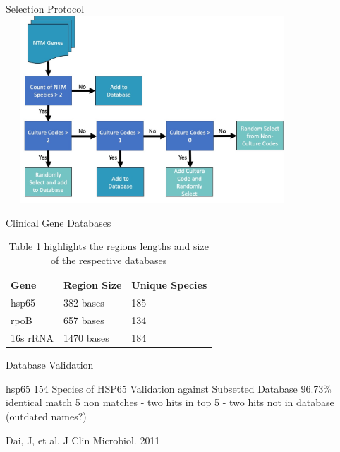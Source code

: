 \documentclass[11pt]{beamer}
\begin{document}
  \begin{frame}{Selection Protocol}
  \center
  \includegraphics[height=7cm, width=11cm]{CPBS_11_18/Selection_Protocol.jpg}
  \end{frame}
  \begin{frame}{Clinical Gene Databases}
  \begin{table}[]
  \begin{tabular}{|l|l|l|}
  \hline
  {\ul \textbf{Gene}} & {\ul \textbf{Region Size}} & {\ul \textbf{Unique Species}} \\     \hline
  hsp65 & 382 bases & 185 \\ \hline
  rpoB & 657 bases & 134 \\ \hline
  16s rRNA & 1470 bases & 184 \\ \hline
  \end{tabular}
  \caption{Table 1 highlights the regions lengths and size of the respective databases}
  \label{Test_Table}
  \end{table}
  \end{frame}
	\begin{frame}{Database Validation}
	\begin{block}{hsp65}
	154 Species of HSP65 Validation against Subsetted Database
	96.73\% identical match 
	5 non matches - two hits in top 5
	- two hits not in database (outdated names?)
	
	\end{block}
	
	
	\tiny{Dai, J, et al. J Clin Microbiol. 2011}
	\end{frame}
	
\end{document}
